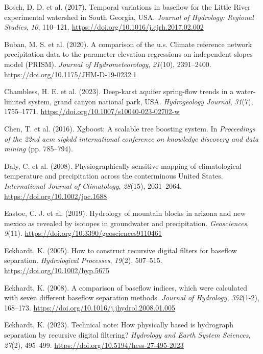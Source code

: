\documentclass[
]{agujournal2019}
\newlength{\cslhangindent}
\newenvironment{CSLReferences}[2] %
 {\begin{list}{}{%
  \setlength{\itemindent}{0pt}
  \setlength{\leftmargin}{0pt}
  \setlength{\parsep}{0pt}
  \ifodd #1
   \setlength{\leftmargin}{\cslhangindent}
   \setlength{\itemindent}{-1\cslhangindent}
  \fi
  \setlength{\itemsep}{#2\baselineskip}}}
 {\end{list}}
\begin{document}
\begin{CSLReferences}{1}{0}
Bosch, D. D. et al. (2017). Temporal variations in baseflow for the
Little River experimental watershed in South Georgia, USA. \emph{Journal
of Hydrology: Regional Studies}, \emph{10}, 110--121.
\url{https://doi.org/10.1016/j.ejrh.2017.02.002}

Buban, M. S. et al. (2020). A comparison of the u.s. Climate reference
network precipitation data to the parameter-elevation regressions on
independent slopes model (PRISM). \emph{Journal of Hydrometeorology},
\emph{21}(10), 2391--2400. \url{https://doi.org/10.1175/JHM-D-19-0232.1}

Chambless, H. E. et al. (2023). Deep-karst aquifer spring-flow trends in
a water-limited system, grand canyon national park, {USA}.
\emph{Hydrogeology Journal}, \emph{31}(7), 1755--1771.
\url{https://doi.org/10.1007/s10040-023-02702-w}

Chen, T. et al. (2016). Xgboost: A scalable tree boosting system. In
\emph{Proceedings of the 22nd acm sigkdd international conference on
knowledge discovery and data mining} (pp. 785--794).

Daly, C. et al. (2008). Physiographically sensitive mapping of
climatological temperature and precipitation across the conterminous
United States. \emph{International Journal of Climatology},
\emph{28}(15), 2031--2064. \url{https://doi.org/10.1002/joc.1688}

Eastoe, C. J. et al. (2019). Hydrology of mountain blocks in arizona and
new mexico as revealed by isotopes in groundwater and precipitation.
\emph{Geosciences}, \emph{9}(11).
\url{https://doi.org/10.3390/geosciences9110461}

Eckhardt, K. (2005). How to construct recursive digital filters for
baseflow separation. \emph{Hydrological Processes}, \emph{19}(2),
507--515. \url{https://doi.org/10.1002/hyp.5675}

Eckhardt, K. (2008). A comparison of baseflow indices, which were
calculated with seven different baseflow separation methods.
\emph{Journal of Hydrology}, \emph{352}(1-2), 168--173.
\url{https://doi.org/10.1016/j.jhydrol.2008.01.005}

Eckhardt, K. (2023). Technical note: How physically based is hydrograph
separation by recursive digital filtering? \emph{Hydrology and Earth
System Sciences}, \emph{27}(2), 495--499.
\url{https://doi.org/10.5194/hess-27-495-2023}


\end{CSLReferences}
\end{document}
